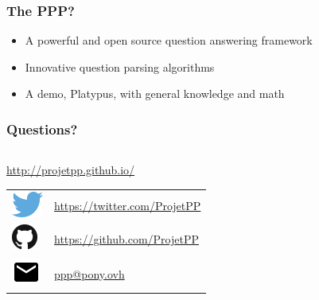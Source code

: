 \begin{frame}
    \frametitle{The PPP?}

    \begin{itemize}
        \item A powerful and open source question answering framework
        \item Innovative question parsing algorithms
        \item A demo, \alert{Platypus}, with general knowledge and math
    \end{itemize}
\end{frame}


\newlength{\logosize}
\setlength{\logosize}{12pt}
\begin{frame}
    \frametitle{Questions?}
    
    \begin{columns}
    \begin{column}{0.55\textwidth}
        \alert{\url{http://projetpp.github.io/}}\vspace{5pt}
        \begin{tabular}{ll}
            \includegraphics[width=\logosize]{Twitter_logo_blue.png} & \href{https://twitter.com/ProjetPP}{https://twitter.com/ProjetPP}\\
            \includegraphics[width=\logosize]{GitHub-Mark-32px.png} &  \href{https://github.com/ProjetPP}{https://github.com/ProjetPP}\\
            \includegraphics[width=\logosize]{ic_email_black_18dp.png} & \href{mailto:ppp@pony.ovh}{ppp@pony.ovh}\\
        \end{tabular}
    \end{column}
    \begin{column}{0.5\textwidth}

\end{column}
\end{columns}
\end{frame}
